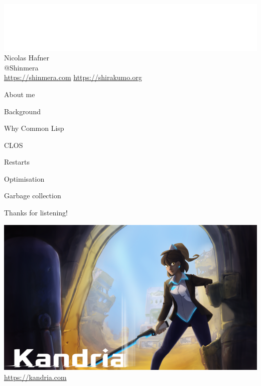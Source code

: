 \documentclass[14pt,t]{beamer}
\renewcommand{\title}[1]{
  {\huge #1} \vskip 0.4cm
}
\begin{document}
\begin{frame}
  \begin{center}
    \includegraphics[width=\textwidth]{logo.png}\\
    \vspace{0.2cm}
    {\LARGE Nicolas Hafner} \\
    \vspace{0.2cm}
    {\Large @Shinmera} \\
    \vspace{0.2cm}
    \url{https://shinmera.com}
    \url{https://shirakumo.org}
  \end{center}
\end{frame}

\begin{frame}
  \title{About me}
\end{frame}

\begin{frame}
  \title{Background}
\end{frame}

\begin{frame}
  \title{Why Common Lisp}
\end{frame}

\begin{frame}
  \title{CLOS}
\end{frame}

\begin{frame}
  \title{Restarts}
\end{frame}

\begin{frame}
  \title{Optimisation}
\end{frame}

\begin{frame}
  \title{Garbage collection}
\end{frame}

\begin{frame}
  \title{Thanks for listening!}
  \centering
  \includegraphics[width=\textwidth]{main capsule.png} \\
  \url{https://kandria.com}
\end{frame}
\end{document}
